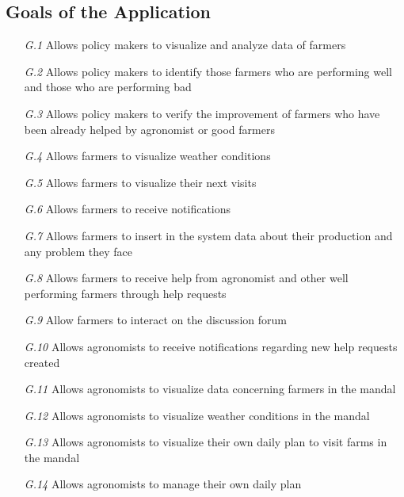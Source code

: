 \subsection{Goals of the Application}
\begin{itemize}
    \item [\textit {G.1}] Allows policy makers to visualize and analyze data of farmers
    \item [\textit {G.2}] Allows policy makers to identify those farmers who are performing well and those who are performing bad
    \item [\textit {G.3}] Allows policy makers to verify the improvement of farmers who have been already helped by agronomist or good farmers
    \item [\textit {G.4}] Allows farmers to visualize weather conditions
    \item [\textit {G.5}] Allows farmers to visualize their next visits
    \item [\textit {G.6}] Allows farmers to receive notifications
    \item [\textit {G.7}] Allows farmers to insert in the system data about their production and any problem they face
    \item [\textit {G.8}] Allows farmers to receive help from agronomist and other well performing farmers through help requests
    \item [\textit {G.9}] Allow farmers to interact on the discussion forum
    \item [\textit {G.10}] Allows agronomists to receive notifications regarding new help requests created
    \item [\textit {G.11}] Allows agronomists to visualize data concerning farmers in the mandal
    \item [\textit {G.12}] Allows agronomists to visualize weather conditions in the mandal
    \item [\textit {G.13}] Allows agronomists to visualize their own daily plan to visit farms in the mandal
    \item [\textit {G.14}] Allows agronomists to manage their own daily plan

\end{itemize}